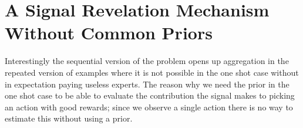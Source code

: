 









\section{A Signal Revelation Mechanism Without Common Priors}

Interestingly the sequential version of the problem opens up aggregation in the repeated version of examples where it is not possible in the one shot case without in expectation paying useless experts. 
The reason why we need the prior in the one shot case to be able to evaluate the contribution the signal makes to picking an action with good rewards; since we observe a single action there is no way to estimate this without using a prior. 

